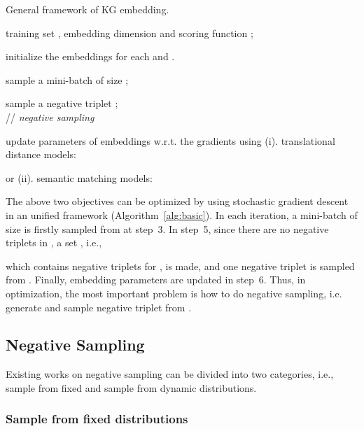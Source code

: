 \documentclass[conference]{IEEEtran}
\begin{document}
\begin{algorithm}[ht]
	\caption{General framework of KG embedding.}
	\label{alg:basic}
	\begin{algorithmic}[1]
		\REQUIRE training set , embedding dimension 
		and scoring function ;
		
		\STATE initialize the embeddings for each  and .
		\FOR{}
		
		\STATE sample a mini-batch  of size ;
		
		\STATE sample a negative triplet ;
		\\ // \textit{negative sampling}
		
		
		\STATE update parameters of embeddings w.r.t. the gradients
		using (i). translational distance models:
		
		or (ii). semantic matching models:
		
		
		\ENDFOR
		
		\ENDFOR
	\end{algorithmic}
\end{algorithm}


The above two objectives can be optimized by
using stochastic gradient descent
in an unified framework (Algorithm~\ref{alg:basic}).
In each iteration,
a mini-batch  of size  is firstly sampled from  at step~3.  
In step~5,
since there are no negative triplets in ,
a set , i.e.,

which contains negative triplets for ,
is made,
and one negative triplet  is sampled from .
Finally,
embedding parameters are updated in step~6.
Thus,
in optimization,
the most important problem is how to do negative sampling,
i.e. generate and sample negative triplet from .











\subsection{Negative Sampling}
\label{sec:negasamp}


Existing works on negative sampling can be divided into two categories,
i.e., sample from fixed and sample from dynamic distributions.

\subsubsection{Sample from fixed distributions}
\end{document}
